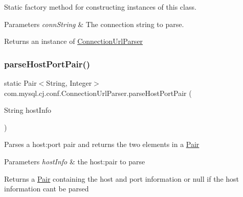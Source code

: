 Static factory method for constructing instances of this class.


\begin{DoxyParams}{Parameters}
{\em conn\+String} & The connection string to parse. \\
\hline
\end{DoxyParams}
\begin{DoxyReturn}{Returns}
an instance of \mbox{\hyperlink{classcom_1_1mysql_1_1cj_1_1conf_1_1_connection_url_parser}{Connection\+Url\+Parser}} 
\end{DoxyReturn}
\mbox{\label{classcom_1_1mysql_1_1cj_1_1conf_1_1_connection_url_parser_af8c96fb1b935d0e91d1af2268582f9c9}} 
\subsubsection{\texorpdfstring{parse\+Host\+Port\+Pair()}{parseHostPortPair()}}
{\footnotesize\ttfamily static Pair$<$String, Integer$>$ com.\+mysql.\+cj.\+conf.\+Connection\+Url\+Parser.\+parse\+Host\+Port\+Pair (\begin{DoxyParamCaption}\item[{String}]{host\+Info }\end{DoxyParamCaption})\hspace{0.3cm}{\ttfamily [static]}}

Parses a host\+:port pair and returns the two elements in a \mbox{\hyperlink{}{Pair}}


\begin{DoxyParams}{Parameters}
{\em host\+Info} & the host\+:pair to parse \\
\hline
\end{DoxyParams}
\begin{DoxyReturn}{Returns}
a \mbox{\hyperlink{}{Pair}} containing the host and port information or null if the host information can\textquotesingle{}t be parsed 
\end{DoxyReturn}
\mbox{\label{classcom_1_1mysql_1_1cj_1_1conf_1_1_connection_url_parser_ab6e4c3d4a5e13537d3746966ffb5c5bb}} 
